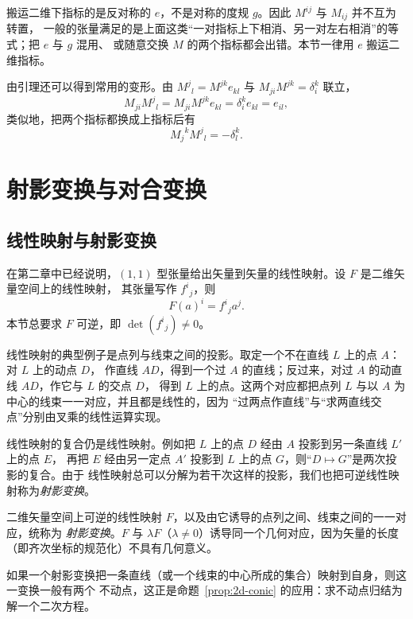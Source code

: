 \begin{remark}
搬运二维下指标的是反对称的 $e$，不是对称的度规 $g$。因此 $M^{ij}$ 与 $M_{ij}$ 并不互为转置，
一般的张量满足的是上面这类“一对指标上下相消、另一对左右相消”的等式；把 $e$ 与 $g$ 混用、
或随意交换 $M$ 的两个指标都会出错。本节一律用 $e$ 搬运二维指标。
\end{remark}

由引理还可以得到常用的变形。由 ${M^j}_l=M^{jk}e_{kl}$ 与 $M_{ji}M^{jk}=\delta^k_i$ 联立，
\[
M_{ji}{M^j}_l=M_{ji}M^{jk}e_{kl}=\delta^k_ie_{kl}=e_{il},
\]
类似地，把两个指标都换成上指标后有
\[
{M_j}^k{M^j}_l=-\delta^k_l .
\]

\section{射影变换与对合变换}

\subsection{线性映射与射影变换}

在第二章中已经说明，$(1,1)$ 型张量给出矢量到矢量的线性映射。设 $F$ 是二维矢量空间上的线性映射，
其张量写作 ${f^i}_j$，则
\[
F(a)^i={f^i}_ja^j .
\]
本节总要求 $F$ 可逆，即 $\det({f^i}_j)\ne0$。

线性映射的典型例子是点列与线束之间的投影。取定一个不在直线 $L$ 上的点 $A$：对 $L$ 上的动点 $D$，
作直线 $AD$，得到一个过 $A$ 的直线；反过来，对过 $A$ 的动直线 $AD$，作它与 $L$ 的交点 $D$，
得到 $L$ 上的点。这两个对应都把点列 $L$ 与以 $A$ 为中心的线束一一对应，并且都是线性的，因为
“过两点作直线”与“求两直线交点”分别由叉乘的线性运算实现。

线性映射的复合仍是线性映射。例如把 $L$ 上的点 $D$ 经由 $A$ 投影到另一条直线 $L'$ 上的点 $E$，
再把 $E$ 经由另一定点 $A'$ 投影到 $L$ 上的点 $G$，则“$D\mapsto G$”是两次投影的复合。由于
线性映射总可以分解为若干次这样的投影，我们也把可逆线性映射称为\emph{射影变换}。

\begin{definition}[射影变换]
二维矢量空间上可逆的线性映射 $F$，以及由它诱导的点列之间、线束之间的一一对应，统称为
\emph{射影变换}。$F$ 与 $\lambda F$（$\lambda\ne0$）诱导同一个几何对应，因为矢量的长度
（即齐次坐标的规范化）不具有几何意义。
\end{definition}

如果一个射影变换把一条直线（或一个线束的中心所成的集合）映射到自身，则这一变换一般有两个
不动点，这正是命题~\ref{prop:2d-conic} 的应用：求不动点归结为解一个二次方程。

